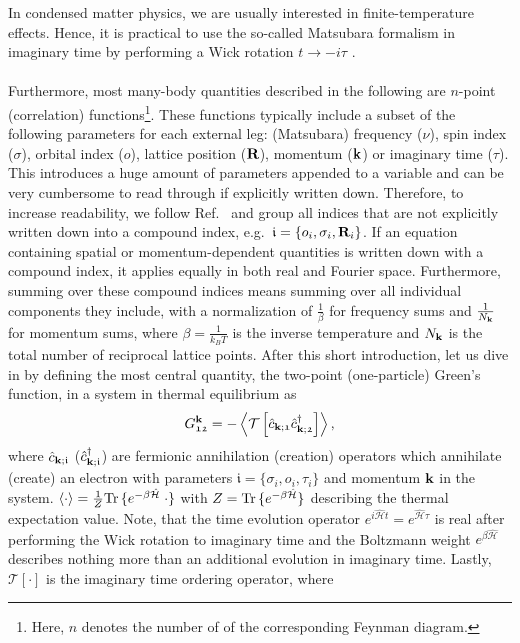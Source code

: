 \documentclass[../../main.tex]{subfiles}
\begin{document}
In condensed matter physics, we are usually interested in finite-temperature effects. Hence, it is practical to use the so-called Matsubara formalism \cite{Matsubara1955} in imaginary time by performing a Wick rotation $t\to -i\tau$ \cite{Wick1954}.
\\\\
Furthermore, most many-body quantities described in the following are $n$-point (correlation) functions\footnote{Here, $n$ denotes the number of  of the corresponding Feynman diagram.}. These functions typically include a subset of the following parameters for each external leg: (Matsubara) frequency ($\nu$), spin index ($\sigma$), orbital index ($o$), lattice position ($\textbf{R}$), momentum ($\textbf{k}$) or imaginary time ($\tau$). This introduces a huge amount of parameters appended to a variable and can be very cumbersome to read through if explicitly written down. Therefore, to increase readability, we follow Ref.~\cite{Bickers1989} and group all indices that are not explicitly written down into a compound index, e.g.\ $\mathfrak{i}=\{o_i, \sigma_i, \textbf{R}_i\}$. If an equation containing spatial or momentum-dependent quantities is written down with a compound index, it applies equally in both real and Fourier space. Furthermore, summing over these compound indices means summing over all individual components they include, with a normalization of $\frac 1\beta$ for frequency sums and $\frac{1}{N_{\textbf{k}}}$ for momentum sums, where $\beta=\frac{1}{k_B T}$ is the inverse temperature and $N_{\textbf{k}}$ is the total number of reciprocal lattice points. 
After this short introduction, let us dive in by defining the most central quantity, the two-point (one-particle) Green's function, in a system in thermal equilibrium as
\begin{align}\label{eq:one_p_green_expectation_val}
	G_{\mathfrak{12}}^{\textbf{k}}=-\left\langle \mathcal{T}\left [\hat{c}_{\textbf{k};\mathfrak{1}}\hat{c}^{\dagger}_{\textbf{k};\mathfrak{2}}\right ]\right\rangle,
\end{align}
where $\hat{c}_{\textbf{k};\mathfrak{i}}$ ($\hat{c}^{\dagger}_{\textbf{k};\mathfrak{i}}$) are fermionic annihilation (creation) operators which annihilate (create) an electron with parameters $\mathfrak{i}=\{\sigma_i, o_i, \tau_i\}$ and momentum $\textbf{k}$ in the system. $\left\langle \cdot\right\rangle=\frac{1}{Z}\mathrm{Tr}\, \{ e^{-\beta\hat{\mathcal{H}}}\;\cdot \}$ with $Z=\mathrm{Tr}\, \{ e^{-\beta\hat{\mathcal{H}}}\}$ describing the thermal expectation value. Note, that the time evolution operator $e^{i\hat{\mathcal{H}}t}=e^{\hat{\mathcal{H}}\tau}$ is real after performing the Wick rotation to imaginary time and the Boltzmann weight $e^{\beta\hat{\mathcal{H}}}$ describes nothing more than an additional evolution in imaginary time. Lastly, $\mathcal{T}[\cdot]$ is the imaginary time ordering operator, where
\end{document}
